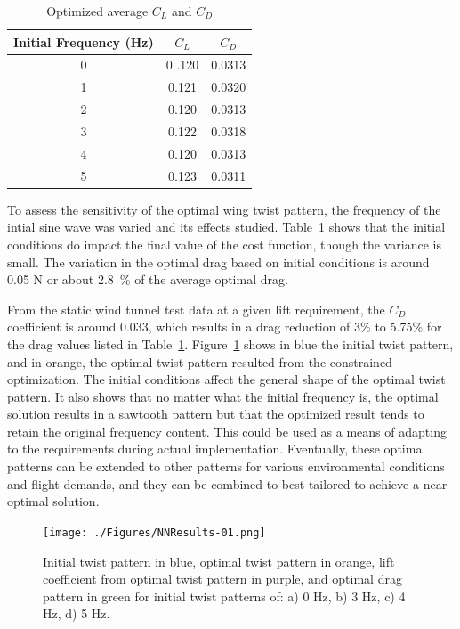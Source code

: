 \documentclass[11pt]{ucthesis}
\begin{document}
\begin{table}[h]
\caption{Optimized average $C_L$ and $C_D$}
\label{tab:drag}
\begin{center}
\begin{tabular}{|c||c||c|}
\hline
Initial Frequency (Hz)&$C_L$&$C_D$\\
\hline
0 &0 .120&0.0313\\
\hline
1 &0.121&0.0320 \\
\hline
2&0.120&0.0313\\
\hline
3&0.122&0.0318\\
\hline
4&0.120&0.0313\\
\hline
5&0.123&0.0311\\
\hline
\end{tabular}
\end{center}
\end{table}
To assess the sensitivity of the optimal wing twist pattern, the frequency of the intial sine wave was varied and its effects studied. Table~\ref{tab:drag} shows that the initial conditions do impact the final value of the cost function, though the variance is small. The variation in the optimal drag based on initial conditions is around 0.05 N or about 2.8~\% of the average optimal drag. 

From the static wind tunnel test data at a given lift requirement, the $C_D$ coefficient is around 0.033, which results in a drag reduction of 3\% to 5.75\% for the drag values listed in Table~\ref{tab:drag}. Figure~\ref{fig:NNResults} shows in blue the initial twist pattern, and in orange, the optimal twist pattern resulted from the constrained optimization. The initial conditions affect the general shape of the optimal twist pattern. It also shows that no matter what the initial frequency is, the optimal solution results in a sawtooth pattern but that the optimized result tends to retain the original frequency content. This could be used as a means of adapting to the requirements during actual implementation. Eventually, these optimal patterns can be extended to other patterns for various environmental conditions and flight demands, and they can be combined to best tailored to achieve a near optimal solution.

\begin{figure}[thpb]
\centering
\texttt{[image: ./Figures/NNResults-01.png]}
\caption{Initial twist pattern in blue, optimal twist pattern in orange, lift coefficient from optimal twist pattern in purple, and optimal drag pattern in green for initial twist patterns of: a) 0 Hz, b) 3 Hz, c) 4 Hz, d) 5 Hz.}
\label{fig:NNResults}
\end{figure}
\end{document}
